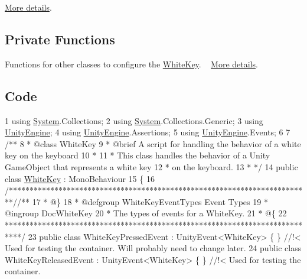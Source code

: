  \hyperlink{group___white_key_unity}{More details}.\hypertarget{group___doc_white_key_DocWhiteKeyPubFunc}{}\subsection{Private Functions}\label{group___doc_white_key_DocWhiteKeyPubFunc}
Functions for other classes to configure the \hyperlink{class_white_key}{White\+Key}. ~\newline
 \hyperlink{group___white_key_pub_func}{More details}.\hypertarget{group___doc_white_key_DocWhiteKeyCode}{}\subsection{Code}\label{group___doc_white_key_DocWhiteKeyCode}

\begin{DoxyCodeInclude}
1 \textcolor{keyword}{using} \hyperlink{namespace_system}{System}.Collections;
2 \textcolor{keyword}{using} \hyperlink{namespace_system}{System}.Collections.Generic;
3 \textcolor{keyword}{using} \hyperlink{namespace_unity_engine}{UnityEngine};
4 \textcolor{keyword}{using} \hyperlink{namespace_unity_engine}{UnityEngine}.Assertions;
5 \textcolor{keyword}{using} \hyperlink{namespace_unity_engine}{UnityEngine}.Events;
6 \textcolor{comment}{}
7 \textcolor{comment}{/**}
8 \textcolor{comment}{ * @class WhiteKey}
9 \textcolor{comment}{ * @brief A script for handling the behavior of a white key on the keyboard}
10 \textcolor{comment}{ * }
11 \textcolor{comment}{ * This class handles the behavior of a Unity GameObject that represents a white key}
12 \textcolor{comment}{ * on the keyboard. }
13 \textcolor{comment}{ * */}
14 \textcolor{keyword}{public} \textcolor{keyword}{class }\hyperlink{class_white_key}{WhiteKey} : MonoBehaviour
15 \{
16     \textcolor{comment}{/*************************************************************************/}\textcolor{comment}{/** }
17 \textcolor{comment}{     * @\}}
18 \textcolor{comment}{     * @defgroup WhiteKeyEventTypes Event Types}
19 \textcolor{comment}{     * @ingroup DocWhiteKey}
20 \textcolor{comment}{     * The types of events for a WhiteKey.}
21 \textcolor{comment}{     * @\{}
22 \textcolor{comment}{    ****************************************************************************/}
23         \textcolor{keyword}{public} \textcolor{keyword}{class }WhiteKeyPressedEvent : UnityEvent<WhiteKey> \{ \} \textcolor{comment}{//!< Used for testing the container.
       Will probably need to change later.}
24 \textcolor{comment}{}        \textcolor{keyword}{public} \textcolor{keyword}{class }WhiteKeyReleasedEvent : UnityEvent<WhiteKey> \{ \} \textcolor{comment}{//!< Used for testing the container.
}
\end{DoxyCodeInclude}
